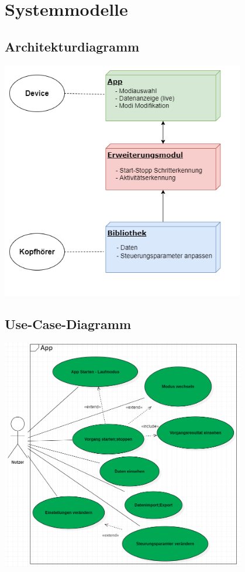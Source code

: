 \documentclass[a4paper,12pt]{article}
\begin{document}
\section{Systemmodelle}
  \subsection{Architekturdiagramm}
  \begin{center}
  	\vspace{100px}
  	\includegraphics[width=0.8\textwidth]{Architekturdiagramm.png}
  \end{center}
  
  \subsection{Use-Case-Diagramm}
  \begin{center}
	\includegraphics[width=0.8\textwidth]{Use-Case Diagramm.png} 
  \end{center}
\end{document}
